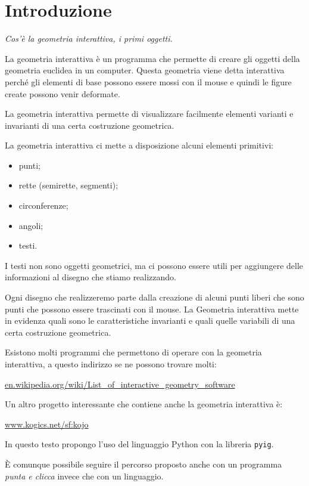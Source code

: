 \section{Introduzione}
\label{sec:introduzione}

\emph{Cos'è la geometria interattiva, i primi oggetti.}

La geometria interattiva è un programma che permette di creare gli oggetti 
della geometria euclidea in un computer.
Questa geometria viene detta interattiva perché gli elementi di base possono 
essere mossi con il mouse e quindi le figure create possono venir deformate.

La geometria interattiva permette di visualizzare facilmente elementi
varianti e invarianti di una certa costruzione geometrica.

La geometria interattiva ci mette a disposizione alcuni elementi primitivi:

\begin{itemize} [noitemsep]
\item punti;
\item rette (semirette, segmenti);
\item circonferenze;
\item angoli;
\item testi.
\end{itemize}

I testi non sono oggetti geometrici, ma ci possono essere utili per aggiungere 
delle informazioni al disegno che stiamo realizzando.

Ogni disegno che realizzeremo parte dalla creazione di alcuni punti liberi che 
sono punti che possono essere trascinati con il mouse. La Geometria interattiva 
mette in evidenza quali sono le caratteristiche invarianti e quali quelle 
variabili di una certa costruzione geometrica.

Esistono molti programmi che permettono di operare con la geometria
interattiva, a questo indirizzo se ne possono trovare molti:

\url{en.wikipedia.org/wiki/List_of_interactive_geometry_software}

Un altro progetto interessante che contiene anche la geometria interattiva è:

\url{www.kogics.net/sf:kojo}

In questo testo propongo l'uso del linguaggio 
Python con la libreria \texttt{pyig}.

È comunque possibile seguire il percorso proposto anche con un programma
\emph{punta e clicca} invece che con un linguaggio.

